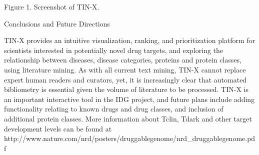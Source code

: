 Figure 1. Screenshot of TIN-X.

Conclusions and Future Directions

TIN-X provides an intuitive visualization, ranking, and prioritization platform for scientists interested in potentially novel drug targets, and exploring the relationship between diseases, disease categories, proteins and protein classes, using literature mining.  As with all current text mining, TIN-X cannot replace expert human readers and curators, yet, it is increasingly clear that automated bibliometry is essential given the volume of literature to be processed.  TIN-X is an important interactive tool in the IDG project, and future plans include adding functionality relating to known drugs and drug classes, and inclusion of additional protein classes. More information about Tclin, Tdark and other target development levels can be found at http://www.nature.com/nrd/posters/druggablegenome/nrd\_druggablegenome.pdf
